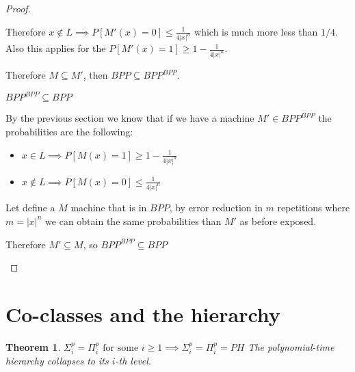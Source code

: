 \documentclass[12pt, a4paper]{article}
\begin{document}
\begin{proof}
\begin{proofpart}
Therefore $x \notin L \implies P[M'(x) = 0] \leq \frac{1}{4|x|^n}$ which is much more less than $1/4$. Also this applies for the $P[M'(x) = 1] \geq 1 - \frac{1}{4|x|^n}$.

Therefore $M \subseteq M'$, then $BPP \subseteq BPP^{BPP}$.
\end{proofpart}

\begin{proofpart}
$BPP^{BPP} \subseteq BPP$

By the previous section we know that if we have a machine $M' \in BPP^{BPP}$ the probabilities are the following:

\begin{itemize}
  \item $x \in L \implies P[M(x) = 1] \geq 1 - \frac{1}{4|x|^n}$
  \item $x \notin L \implies P[M(x) = 0] \leq \frac{1}{4|x|^n}$
\end{itemize}

Let define a $M$ machine that is in $BPP$, by error reduction in $m$ repetitions where $m = |x|^n$ we can obtain the same probabilities than $M'$ as before exposed.

Therefore $M' \subseteq M$, so $BPP^{BPP} \subseteq BPP$\qedhere
\end{proofpart}
\end{proof}

\section{Co-classes and the hierarchy}
\newtheorem{phcol}{Theorem}
\begin{phcol}
  $\Sigma_i^p = \Pi_i^p \text{ for some } i \geq 1  \implies \Sigma_i^p = \Pi_i^p = PH$ The polynomial-time hierarchy collapses to its $i$-th level.
\end{phcol}
\end{document}
